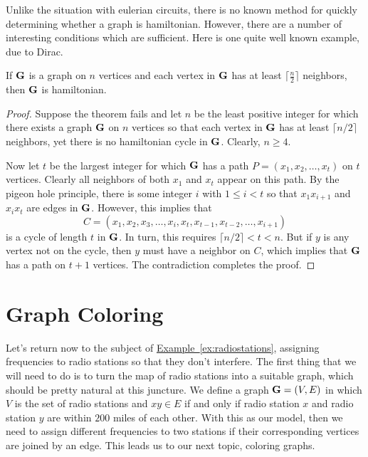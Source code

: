 Unlike the situation with eulerian circuits, there is no
known method for quickly determining whether a graph is
hamiltonian.  However, there are a number of interesting
conditions which are sufficient.  Here is one quite well
known example, due to Dirac.

\begin{theorem}\label{thm:graphs:dirac}
If $\mathbf{G}$ is a graph on $n$ vertices and each vertex
in $\mathbf{G}$ has at least $\lceil \frac{n}{2}\rceil$ neighbors,
then $\mathbf{G}$ is hamiltonian.
\end{theorem}

\begin{proof}
Suppose the theorem fails and let $n$ be the least positive
integer for which there exists a graph $\mathbf{G}$ on $n$ vertices
so that each vertex in $\mathbf{G}$ has at least $\lceil n/2\rceil$
neighbors, yet there is no hamiltonian cycle in $\mathbf{G}$. Clearly,
$n\ge4$.

Now let $t$ be the largest integer for which $\mathbf{G}$ has
a path $P=(x_1,x_2,\dots,x_t)$ on $t$ vertices.  Clearly all
neighbors of both $x_1$ and $x_t$ appear on this path.  By
the pigeon hole principle, there is some integer $i$ with
$1\le i<t$ so that $x_1x_{i+1}$ and $x_{i}x_t$ are edges
in $\mathbf{G}$.  However, this implies that
\[
C=(x_1,x_2,x_3,\dots,x_i,x_t,x_{t-1},x_{t-2},\dots,x_{i+1})
\]
is a cycle of length $t$ in $\mathbf{G}$. In turn, this 
requires $\lceil n/2\rceil < t<n$.  But if $y$ is any vertex
not on the cycle, then $y$ must have a neighbor on $C$, which
implies that $\mathbf{G}$ has a path on $t+1$ vertices.  The contradiction
completes the proof.
\end{proof}

\section{Graph Coloring}\label{s:graphs:color}

Let's return now to the subject of
\hyperref[ex:radiostations]{Example~\ref*{ex:radiostations}},
assigning frequencies to radio stations so that they don't
interfere. The first thing that we will need to do is to turn the map
of radio stations into a suitable graph, which should be pretty
natural at this juncture. We define a graph $\mathbf{G}=(V,E)$ in which $V$ is the
set of radio stations and $xy\in E$ if and only if radio station $x$
and radio station $y$ are within $200$ miles of each other. With this
as our model, then we need to assign different frequencies to two
stations if their corresponding vertices are joined by an edge. This
leads us to our next topic, coloring graphs.

